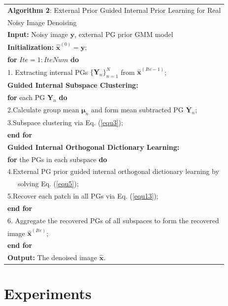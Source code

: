 \vspace{3mm}
\begin{table}[htpb]
\label{alg2}
\begin{tabular}{l}
\hline
\textbf{Algorithm 2}: External Prior Guided Internal Prior Learning for Real 
\\
\quad \quad \quad \quad \quad \quad Noisy Image Denoising
\\
\hline
\textbf{Input:} Noisy image $\mathbf{y}$, external PG prior GMM model
\\
\textbf{Initialization:} $\hat{\mathbf{x}}^{(0)}=\mathbf{y}$;
\\
\textbf{for} $Ite = 1:IteNum$ \textbf{do}
\\
1. Extracting internal PGs $\{\bm{Y}_{n}\}_{n=1}^{N}$ from $\hat{\mathbf{x}}^{(Ite-1)}$;
\\
\textbf{Guided Internal Subspace Clustering:}
\\
\quad\textbf{for} each PG $\bm{Y}_{n}$ \textbf{do}
\\
2.\quad Calculate group mean $\bm{\mu}_{n}$ and form mean subtracted PG $\bm{\overline{Y}}_{n}$;
\\
3.\quad Subspace clustering via Eq. (\ref{equ3});
\\
\quad\textbf{end for}
\\
\textbf{Guided Internal Orthogonal Dictionary Learning:}
\\
\quad\textbf{for} the PGs in each subspace \textbf{do}
\\
4.\quad External PG prior guided internal orthogonal dictionary learning by
\\
\quad \ \ \ solving Eq. (\ref{equ5});
\\
5.\quad Recover each patch in all PGs via Eq. (\ref{equ13});
\\
\quad\textbf{end for}
\\
6. Aggregate the recovered PGs of all subspaces to form the recovered 
\\
\quad image $\hat{\mathbf{x}}^{(Ite)}$;
\\
\textbf{end for}
\\
\textbf{Output:} The denoised image $\hat{\mathbf{x}}$.
\\
\hline
\end{tabular}
\end{table}

\section{Experiments}

